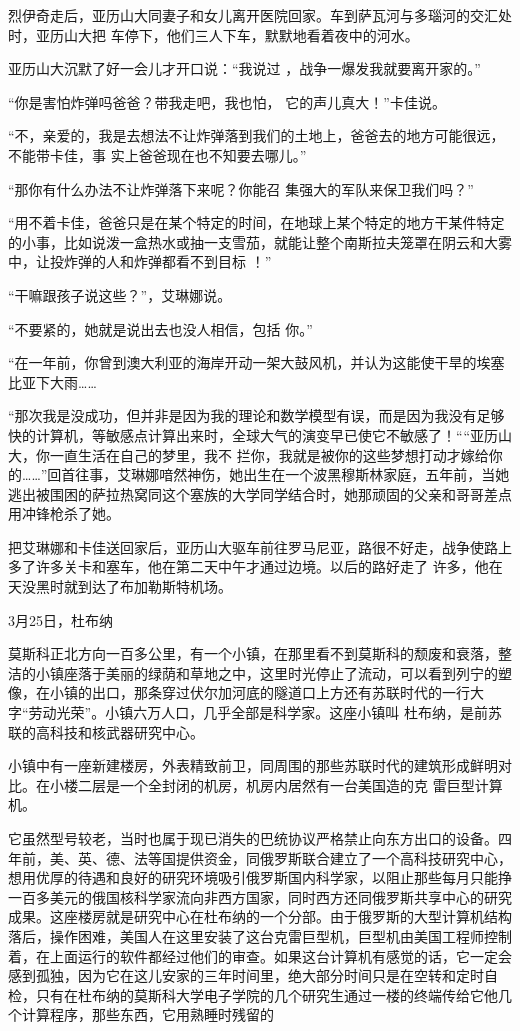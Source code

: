 \documentclass{article}
\begin{document}
烈伊奇走后，亚历山大同妻子和女儿离开医院回家。车到萨瓦河与多瑙河的交汇处时，亚历山大把
车停下，他们三人下车，默默地看着夜中的河水。 

亚历山大沉默了好一会儿才开口说：“我说过
，战争一爆发我就要离开家的。” 

“你是害怕炸弹吗爸爸？带我走吧，我也怕，
它的声儿真大！”卡佳说。 

“不，亲爱的，我是去想法不让炸弹落到我们的土地上，爸爸去的地方可能很远，不能带卡佳，事
实上爸爸现在也不知要去哪儿。” 

\newpage

“那你有什么办法不让炸弹落下来呢？你能召
集强大的军队来保卫我们吗？” 

“用不着卡佳，爸爸只是在某个特定的时间，在地球上某个特定的地方干某件特定的小事，比如说泼一盒热水或抽一支雪茄，就能让整个南斯拉夫笼罩在阴云和大雾中，让投炸弹的人和炸弹都看不到目标
！” 


“干嘛跟孩子说这些？”，艾琳娜说。 

“不要紧的，她就是说出去也没人相信，包括
你。” 

“在一年前，你曾到澳大利亚的海岸开动一架大鼓风机，并认为这能使干旱的埃塞比亚下大雨……

“那次我是没成功，但并非是因为我的理论和数学模型有误，而是因为我没有足够快的计算机，等敏感点计算出来时，全球大气的演变早已使它不敏感了！““亚历山大，你一直生活在自己的梦里，我不
\newpage
拦你，我就是被你的这些梦想打动才嫁给你的……”回首往事，艾琳娜喑然神伤，她出生在一个波黑穆斯林家庭，五年前，当她逃出被围困的萨拉热窝同这个塞族的大学同学结合时，她那顽固的父亲和哥哥差点
用冲锋枪杀了她。 

把艾琳娜和卡佳送回家后，亚历山大驱车前往罗马尼亚，路很不好走，战争使路上多了许多关卡和塞车，他在第二天中午才通过边境。以后的路好走了
许多，他在天没黑时就到达了布加勒斯特机场。 


3月25日，杜布纳 

莫斯科正北方向一百多公里，有一个小镇，在那里看不到莫斯科的颓废和衰落，整洁的小镇座落于美丽的绿荫和草地之中，这里时光停止了流动，可以看到列宁的塑像，在小镇的出口，那条穿过伏尔加河底的隧道口上方还有苏联时代的一行大字“劳动光荣”。小镇六万人口，几乎全部是科学家。这座小镇叫
杜布纳，是前苏联的高科技和核武器研究中心。 

\newpage

小镇中有一座新建楼房，外表精致前卫，同周围的那些苏联时代的建筑形成鲜明对比。在小楼二层是一个全封闭的机房，机房内居然有一台美国造的克
雷巨型计算机。 

它虽然型号较老，当时也属于现已消失的巴统协议严格禁止向东方出口的设备。四年前，美、英、德、法等国提供资金，同俄罗斯联合建立了一个高科技研究中心，想用优厚的待遇和良好的研究环境吸引俄罗斯国内科学家，以阻止那些每月只能挣一百多美元的俄国核科学家流向非西方国家，同时西方还同俄罗斯共享中心的研究成果。这座楼房就是研究中心在杜布纳的一个分部。由于俄罗斯的大型计算机结构落后，操作困难，美国人在这里安装了这台克雷巨型机，巨型机由美国工程师控制着，在上面运行的软件都经过他们的审查。如果这台计算机有感觉的话，它一定会感到孤独，因为它在这儿安家的三年时间里，绝大部分时间只是在空转和定时自检，只有在杜布纳的莫斯科大学电子学院的几个研究生通过一楼的终端传给它他几个计算程序，那些东西，它用熟睡时残留的
\end{document}
